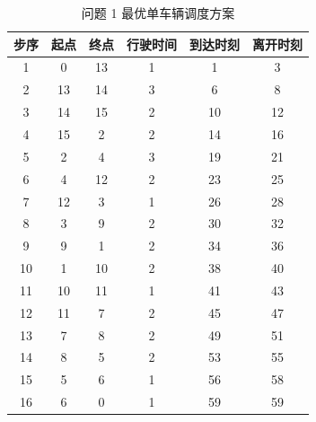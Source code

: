 \begin{table}[htbp]
\centering
\caption{问题 1 最优单车辆调度方案}\label{tab:q1_route}
\begin{tabular}{cccccc}
\toprule
步序 & 起点 & 终点 & 行驶时间 & 到达时刻 & 离开时刻 \\
\midrule
1 & 0 & 13 & 1 & 1 & 3 \\
2 & 13 & 14 & 3 & 6 & 8 \\
3 & 14 & 15 & 2 & 10 & 12 \\
4 & 15 & 2 & 2 & 14 & 16 \\
5 & 2 & 4 & 3 & 19 & 21 \\
6 & 4 & 12 & 2 & 23 & 25 \\
7 & 12 & 3 & 1 & 26 & 28 \\
8 & 3 & 9 & 2 & 30 & 32 \\
9 & 9 & 1 & 2 & 34 & 36 \\
10 & 1 & 10 & 2 & 38 & 40 \\
11 & 10 & 11 & 1 & 41 & 43 \\
12 & 11 & 7 & 2 & 45 & 47 \\
13 & 7 & 8 & 2 & 49 & 51 \\
14 & 8 & 5 & 2 & 53 & 55 \\
15 & 5 & 6 & 1 & 56 & 58 \\
16 & 6 & 0 & 1 & 59 & 59 \\
\bottomrule
\end{tabular}
\end{table}
